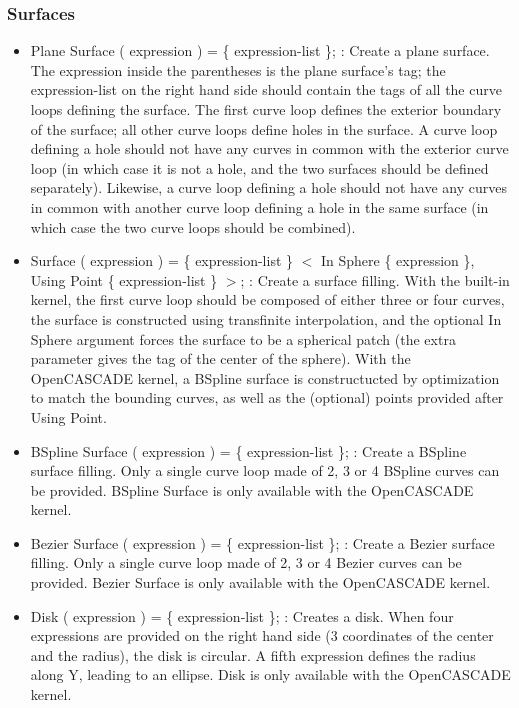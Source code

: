 \documentclass[dvipdfmx, 9pt, a4paper]{article}
\numberwithin{equation}{section}
\begin{document}
\subsubsection{Surfaces}
\begin{itemize}
\item Plane Surface ( expression ) = \{ expression-list \}; : Create a plane surface. The expression inside the parentheses is the plane surface's tag; the expression-list on the right hand side should contain the tags of all the curve loops defining the surface. The first curve loop defines the exterior boundary of the surface; all other curve loops define holes in the surface. A curve loop defining a hole should not have any curves in common with the exterior curve loop (in which case it is not a hole, and the two surfaces should be defined separately). Likewise, a curve loop defining a hole should not have any curves in common with another curve loop defining a hole in the same surface (in which case the two curve loops should be combined).
\item Surface ( expression ) = \{ expression-list \} $<$ In Sphere \{ expression \}, Using Point \{ expression-list \} $>$; : Create a surface filling. With the built-in kernel, the first curve loop should be composed of either three or four curves, the surface is constructed using transfinite interpolation, and the optional In Sphere argument forces the surface to be a spherical patch (the extra parameter gives the tag of the center of the sphere). With the OpenCASCADE kernel, a BSpline surface is constructucted by optimization to match the bounding curves, as well as the (optional) points provided after Using Point.
\item BSpline Surface ( expression ) = \{ expression-list \}; : Create a BSpline surface filling. Only a single curve loop made of 2, 3 or 4 BSpline curves can be provided. BSpline Surface is only available with the OpenCASCADE kernel.
\item Bezier Surface ( expression ) = \{ expression-list \}; : Create a Bezier surface filling. Only a single curve loop made of 2, 3 or 4 Bezier curves can be provided. Bezier Surface is only available with the OpenCASCADE kernel.
\item Disk ( expression ) = \{ expression-list \}; : Creates a disk. When four expressions are provided on the right hand side (3 coordinates of the center and the radius), the disk is circular. A fifth expression defines the radius along Y, leading to an ellipse. Disk is only available with the OpenCASCADE kernel.

\end{itemize}
\end{document}
